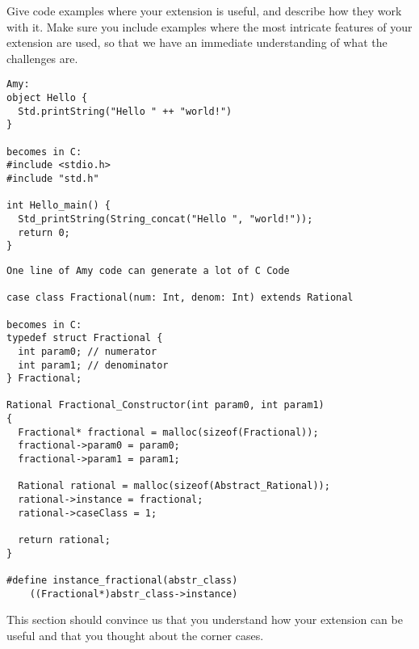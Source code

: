 Give code examples where your extension is useful, and describe how they work
with it. Make sure you include examples where the most intricate features of
your extension are used, so that we have an immediate understanding of what the
challenges are.

%

\begin{lstlisting}
Amy:
object Hello {
  Std.printString("Hello " ++ "world!")
}

becomes in C:
#include <stdio.h>
#include "std.h"

int Hello_main() {
  Std_printString(String_concat("Hello ", "world!"));
  return 0;
}
\end{lstlisting}

\begin{lstlisting}
One line of Amy code can generate a lot of C Code

case class Fractional(num: Int, denom: Int) extends Rational

becomes in C:
typedef struct Fractional {
  int param0; // numerator
  int param1; // denominator
} Fractional;

Rational Fractional_Constructor(int param0, int param1) 
{
  Fractional* fractional = malloc(sizeof(Fractional));
  fractional->param0 = param0;
  fractional->param1 = param1;

  Rational rational = malloc(sizeof(Abstract_Rational));
  rational->instance = fractional;
  rational->caseClass = 1;

  return rational;
}

#define instance_fractional(abstr_class)
	((Fractional*)abstr_class->instance)

\end{lstlisting}
This section should convince us that you understand how your extension can be
useful and that you thought about the corner cases.
